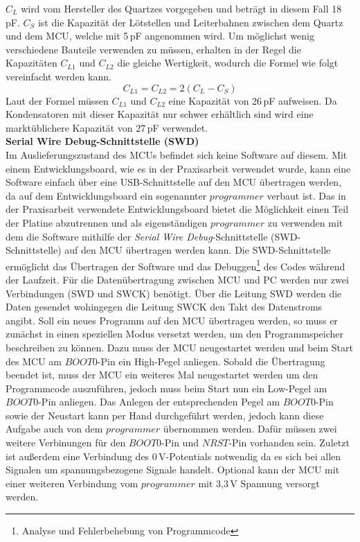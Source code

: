 \textit{$C_L$} wird vom Hersteller des Quartzes vorgegeben und beträgt in diesem Fall 18\,pF. \textit{$C_S$} ist die Kapazität der Lötstellen und Leiterbahnen zwischen dem Quartz und dem MCU, welche mit 5\,pF angenommen wird. Um möglichst wenig verschiedene Bauteile verwenden zu müssen, erhalten in der Regel die Kapazitäten $C_{L1}$ und $C_{L2}$ die gleiche Wertigkeit, wodurch die Formel wie folgt vereinfacht werden kann.
\begin{equation}
	C_{L1} =  C_{L2} = 2(C_L - C_S)
\end{equation}
Laut der Formel müssen $C_{L1}$ und $C_{L2}$ eine Kapazität von 26\,pF aufweisen. Da Kondensatoren mit dieser Kapazität nur schwer erhältlich sind wird eine marktüblichere Kapazität von 27\,pF verwendet.\\
\newline
\textbf{Serial Wire Debug-Schnittstelle (SWD)}\\
Im Auslieferungszustand des MCUs befindet sich keine Software auf diesem. Mit einem Entwicklungsboard, wie es in der Praxisarbeit verwendet wurde, kann eine Software einfach über eine USB-Schnittstelle auf den MCU übertragen werden, da auf dem Entwicklungsboard ein sogenannter $programmer$ verbaut ist. Das in der Praxisarbeit verwendete Entwicklungsboard bietet die Möglichkeit einen Teil der Platine abzutrennen und als eigenständigen $programmer$ zu verwenden mit dem die Software mithilfe der \textit{Serial Wire Debug}-Schnittstelle (SWD-Schnittstelle) auf den MCU übertragen werden kann. Die SWD-Schnittstelle ermöglicht das Übertragen der Software und das Debuggen\footnote{Analyse und Fehlerbehebung von Programmcode} des Codes während der Laufzeit. Für die Datenübertragung zwischen MCU und PC werden nur zwei Verbindungen (SWD und SWCK) benötigt. Über die Leitung SWD werden die Daten gesendet wohingegen die Leitung SWCK den Takt des Datenstroms angibt. Soll ein neues Programm auf den MCU übertragen werden, so muss er zunächst in einen speziellen Modus versetzt werden, um den Programmspeicher beschreiben zu können. Dazu muss der MCU neugestartet werden und beim Start des MCU am $BOOT0$-Pin ein High-Pegel anliegen. Sobald die Übertragung beendet ist, muss der MCU ein weiteres Mal neugestartet werden um den Programmcode auszuführen, jedoch muss beim Start nun ein Low-Pegel am $BOOT0$-Pin anliegen. Das Anlegen der entsprechenden Pegel am $BOOT0$-Pin sowie der Neustart kann per Hand durchgeführt werden, jedoch kann diese Aufgabe auch von dem $programmer$ übernommen werden. Dafür müssen zwei weitere Verbinungen für den $BOOT0$-Pin und $NRST$-Pin vorhanden sein. Zuletzt ist außerdem eine Verbindung des 0\,V-Potentials notwendig da es sich bei allen Signalen um spannungsbezogene Signale handelt. Optional kann der MCU mit einer weiteren Verbindung vom $programmer$ mit 3,3\,V Spannung versorgt werden.\\
